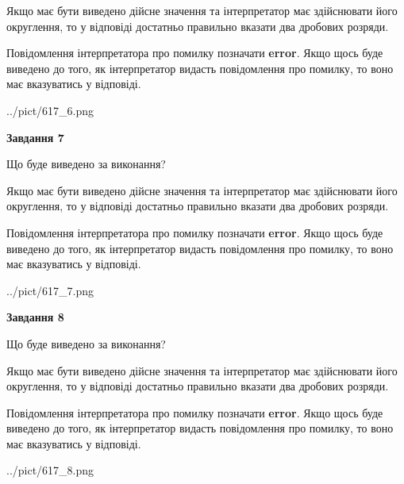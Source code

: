 \documentclass[12pt, ukrainian]{article}
\begin{document}
{\begin {Large}
Якщо має бути виведено дійсне значення та інтерпретатор має здійснювати його округлення, 
то у відповіді достатньо правильно вказати два дробових розряди.

Повідомлення інтерпретатора про помилку позначати \textbf{error}.
Якщо щось буде виведено до того, як інтерпретатор видасть повідомлення про помилку, 
то воно має вказуватись у відповіді. \par

\begin{center}
	{../pict/617_6.png}
\end{center}
\newpage

{\begin {center}\textbf{Завдання 7}\end {center}}\par
Що буде виведено за виконання? \par

Якщо має бути виведено дійсне значення та інтерпретатор має здійснювати його округлення, 
то у відповіді достатньо правильно вказати два дробових розряди.

Повідомлення інтерпретатора про помилку позначати \textbf{error}.
Якщо щось буде виведено до того, як інтерпретатор видасть повідомлення про помилку, 
то воно має вказуватись у відповіді. \par

\begin{center}
	{../pict/617_7.png}
\end{center}
\newpage

{\begin {center}\textbf{Завдання 8}\end {center}}\par
Що буде виведено за виконання? \par

Якщо має бути виведено дійсне значення та інтерпретатор має здійснювати його округлення, 
то у відповіді достатньо правильно вказати два дробових розряди.

Повідомлення інтерпретатора про помилку позначати \textbf{error}.
Якщо щось буде виведено до того, як інтерпретатор видасть повідомлення про помилку, 
то воно має вказуватись у відповіді. \par

\begin{center}
	{../pict/617_8.png}
\end{center}
\newpage


\end{Large}}
\end{document}
